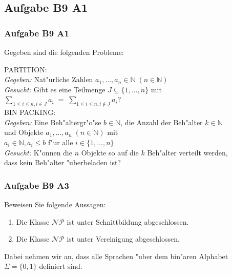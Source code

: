 \subsection{Aufgabe B9 A1}
\begin{frame}
	\frametitle{Aufgabe B9 A1}
	Gegeben sind die folgenden Probleme:
	\begin{tabbing}
	PARTITION:\\
	\textit{Gegeben:} \= Nat"urliche Zahlen $a_1,...,a_n \in \mathbb{N} \; (n \in
	\mathbb{N})$\\
	\textit{Gesucht:} \> Gibt es eine Teilmenge $J \subseteq \{1,...,n\}$ mit\\
	\> $\sum\limits_{1 \leq i \leq n, i \in J}a_i \; = \;
	\sum\limits_{1 \leq i \leq n, i \notin J}a_i$?\\[8pt]
	BIN PACKING:\\
	\textit{Gegeben:} \> Eine Beh"altergr"o"se $b \in \mathbb{N}$, die Anzahl der
	Beh"alter $k \in \mathbb{N}$\\
	\> und Objekte $a_1,...,a_n \; (n \in \mathbb{N})$ mit\\
	\> $a_i \in \mathbb{N}, a_i \leq b$ f"ur alle $i \in \{1,...,n\}$\\
	\textit{Gesucht:} \> K"onnen die $n$ Objekte so auf die $k$ Beh"alter verteilt
	werden,\\
	\> dass kein Beh"alter "uberbeladen ist?\\
	\end{tabbing}
\end{frame}

\begin{frame}
	\frametitle{Aufgabe B9 A3}
	Beweisen Sie folgende Aussagen:
	\begin{enumerate}
	\item Die Klasse $\mathcal{NP}$ ist unter Schnittbildung abgeschlossen.
	\item Die Klasse $\mathcal{NP}$ ist unter Vereinigung abgeschlossen.
	\end{enumerate}
	Dabei nehmen wir an, dass alle Sprachen "uber dem bin"aren Alphabet $\Sigma =
	\{0,1\}$ definiert sind.
\end{frame}

